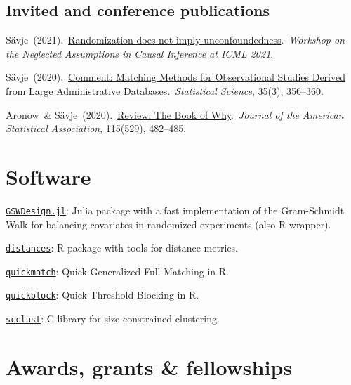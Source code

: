 \documentclass[10pt,letterpaper]{article}
\newenvironment{infolist}{
	\begin{list}{}{
		\setlength{\parskip}{0pt}
		\setlength{\itemsep}{4pt}
		\setlength{\parsep}{0.3em}
		\setlength{\leftmargin}{0em}
		\setlength{\labelwidth}{0em}
		}
	}{
\end{list}
}
\newcommand{\infoitem}[1]{\item {#1}}
\begin{document}
	\subsection*{Invited and conference publications}

	\begin{infolist}
		\infoitem{Sävje\ (2021).\ \href{https://arxiv.org/abs/2107.14197}{Randomization does not imply unconfoundedness}.\ \textit{Workshop on the Neglected Assumptions in Causal Inference at ICML 2021}.}
		\infoitem{Sävje\ (2020).\ \href{https://projecteuclid.org/journals/statistical-science/volume-35/issue-3/Comment--Matching-Methods-for-Observational-Studies-Derived-from-Large/10.1214/19-STS739.short}{Comment: Matching Methods for Observational Studies Derived from Large Administrative Databases}.\ \textit{Statistical Science}, 35(3), 356--360.}
		\infoitem{Aronow\ \& Sävje\ (2020).\ \href{https://www.tandfonline.com/doi/full/10.1080/01621459.2020.1721245}{Review: The Book of Why}.\ \textit{Journal of the American Statistical Association}, 115(529), 482--485.}
	\end{infolist}


	\section*{Software}

	\begin{infolist}
		\infoitem{\href{https://github.com/crharshaw/GSWDesign.jl}{\texttt{GSWDesign.jl}}: Julia package with a fast implementation of the Gram-Schmidt Walk for balancing covariates in randomized experiments (also R wrapper).}
		\infoitem{\href{https://github.com/fsavje/distances}{\texttt{distances}}: R package with tools for distance metrics.}
		\infoitem{\href{https://github.com/fsavje/quickmatch}{\texttt{quickmatch}}: Quick Generalized Full Matching in R.}
		\infoitem{\href{https://github.com/fsavje/quickblock}{\texttt{quickblock}}: Quick Threshold Blocking in R.}
		\infoitem{\href{https://github.com/fsavje/scclust}{\texttt{scclust}}: C library for size-constrained clustering.}
	\end{infolist}


	\section*{Awards, grants \& fellowships}
\end{document}
